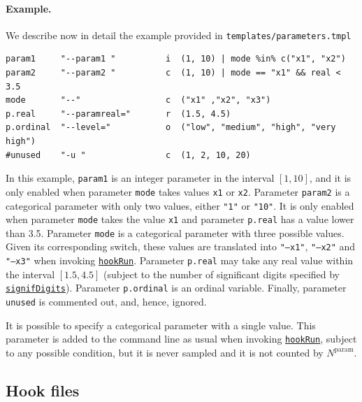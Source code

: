 \documentclass[a4paper]{article}
\newcommand{\Nparam}{\ensuremath{{N^\text{param}}}\xspace}
\newcommand{\parameter}[1]{\hyperlink{opt:#1}{\texttt{#1}}}
\begin{document}
\paragraph{Example.}

We describe now in detail the example provided in \texttt{templates/parameters.tmpl}
\begin{verbatim}
param1     "--param1 "          i  (1, 10) | mode %in% c("x1", "x2")
param2     "--param2 "          c  (1, 10) | mode == "x1" && real < 3.5
mode       "--"                 c  ("x1" ,"x2", "x3")
p.real     "--paramreal="       r  (1.5, 4.5)
p.ordinal  "--level="           o  ("low", "medium", "high", "very high")
#unused    "-u "                c  (1, 2, 10, 20)
\end{verbatim}

In this example, \texttt{param1} is an integer parameter in the interval $[1,10]$, and it
is only enabled when parameter \texttt{mode} takes values \texttt{x1} or \texttt{x2}.  Parameter \texttt{param2} is a
categorical parameter with only two values, either \texttt{"1"} or \texttt{"10"}. It is
only enabled when parameter \texttt{mode} takes the value \texttt{x1} and parameter \texttt{p.real}
has a value lower than 3.5. Parameter \texttt{mode} is a categorical parameter
with three possible values. Given its corresponding switch, these values are translated into \texttt{"--x1"}, \texttt{"--x2"} and \texttt{"--x3"} when invoking
\parameter{hookRun}. Parameter \texttt{p.real} may take any real value
within the interval $[1.5, 4.5]$ (subject to the number of significant
digits specified by \parameter{signifDigits}). Parameter
\texttt{p.ordinal} is an ordinal variable.  Finally,
parameter \texttt{unused} is commented out, and, hence, ignored.

It is possible to specify a categorical parameter with a single
value. This parameter is added to the command line as usual when
invoking \parameter{hookRun}, subject to any possible condition, but
it is never sampled and it is not counted by $\Nparam$.


\subsection{Hook files}\label{sec:hooks}
\end{document}
